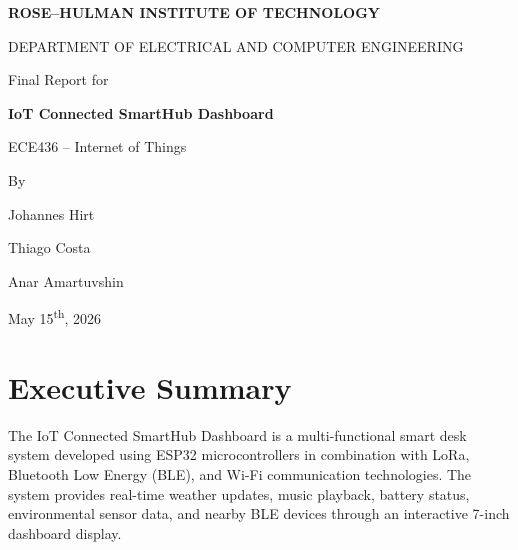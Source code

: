 \documentclass[11pt,letterpaper]{article}
\begin{document}
\begin{titlepage}
    \centering
    \vspace*{2.5cm}

    {\Large\bfseries ROSE--HULMAN INSTITUTE OF TECHNOLOGY\par}
    \vspace{0.8cm}
    {\large DEPARTMENT OF ELECTRICAL AND COMPUTER ENGINEERING\par}
    \vspace{2.5cm}

    {\large Final Report for\par}
    \vspace{0.6cm}
    {\Huge\bfseries IoT Connected SmartHub Dashboard\par}
    \vspace{1.5cm}

    {\large ECE436 -- Internet of Things\par}
    \vspace{2.5cm}

    {\large By\par}
    \vspace{0.6cm}
    {\large Johannes Hirt\par}
    {\large Thiago Costa\par}
    {\large Anar Amartuvshin\par}
    \vspace{2.5cm}

    {\large May 15\textsuperscript{th}, 2026\par}

    \vfill
\end{titlepage}

\tableofcontents
\listoffigures
\listoftables
\clearpage
{}
\setcounter{page}{1}

\section{Executive Summary}
The IoT Connected SmartHub Dashboard is a multi-functional smart desk
system developed using ESP32 microcontrollers in combination with LoRa,
Bluetooth Low Energy (BLE), and Wi-Fi communication
technologies. The system provides
real-time weather updates, music playback, battery status,
environmental sensor data, and nearby BLE devices through an
interactive 7-inch dashboard display.
\end{document}
